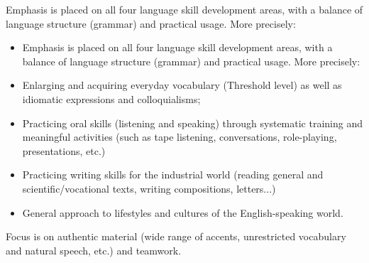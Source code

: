 Emphasis is placed on all four language skill development areas, with a balance of language structure (grammar) and practical usage. More precisely:
\begin{itemize}
    \item Emphasis is placed on all four language skill development areas, with a balance of language structure (grammar) and practical usage. More precisely:
    \item Enlarging and acquiring everyday vocabulary (Threshold level) as well as idiomatic expressions and colloquialisms;
    \item Practicing oral skills (listening and speaking) through systematic training and meaningful activities (such as tape listening, conversations, role-playing, presentations, etc.)
    \item Practicing writing skills for the industrial world (reading general and scientific/vocational texts, writing compositions, letters...)
    \item General approach to lifestyles and cultures of the English-speaking world.
\end{itemize}
Focus is on authentic material (wide range of accents, unrestricted vocabulary and natural speech, etc.) and teamwork.
